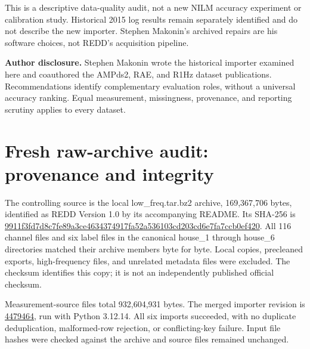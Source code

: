 \documentclass[11pt,letterpaper]{article}
\begin{document}
This is a descriptive data-quality audit, not a new NILM accuracy experiment or calibration study. Historical 2015 log results remain separately identified and do not describe the new importer. Stephen Makonin's archived repairs are his software choices, not REDD's acquisition pipeline.

\textbf{Author disclosure.} Stephen Makonin wrote the historical importer examined here and coauthored the AMPds2, RAE, and R1Hz dataset publications. Recommendations identify complementary evaluation roles, without a universal accuracy ranking. Equal measurement, missingness, provenance, and reporting scrutiny applies to every dataset. \cite{ref7,ref10,ref13}

\clearpage
\section{Fresh raw-archive audit: provenance and integrity}
The controlling source is the local low\_freq.tar.bz2 archive, 169,367,706 bytes, identified as REDD Version 1.0 by its accompanying README. Its SHA-256 is \url{9911f3fd7d8c7fe89a3ce4634374917fa52a536103cd203cd6e7fa7ccb0ef420}. All 116 channel files and six label files in the canonical house\_1 through house\_6 directories matched their archive members byte for byte. Local copies, precleaned exports, high-frequency files, and unrelated metadata files were excluded. The checksum identifies this copy; it is not an independently published official checksum. \cite{ref14}

Measurement-source files total 932,604,931 bytes. The merged importer revision is \href{https://github.com/smakonin/DataWrangle_REDD/commit/447946445e61a0dd2df667b6d7cab9e50950a0a0}{4479464}, run with Python 3.12.14. All six imports succeeded, with no duplicate deduplication, malformed-row rejection, or conflicting-key failure. Input file hashes were checked against the archive and source files remained unchanged.
\end{document}

